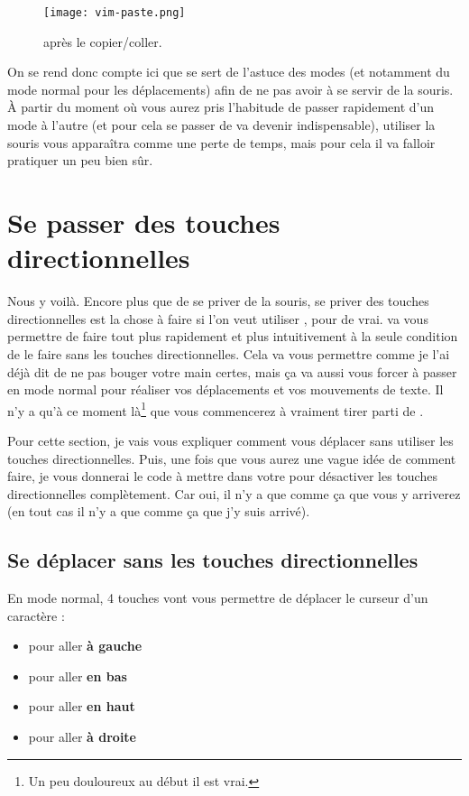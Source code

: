 \begin{figure}%
  \texttt{[image: vim-paste.png]}
  \caption{\vim après le copier/coller.}
  \label{fig:vim-paste}
\end{figure}

On se rend donc compte ici que \vim se sert de l'astuce des modes (et notamment du mode \og normal \fg{} pour les déplacements) afin de ne pas avoir à se servir de la souris.
À partir du moment où vous aurez pris l'habitude de passer rapidement d'un mode à l'autre (et pour cela se passer de \ttesc va devenir indispensable), utiliser la souris vous apparaîtra comme une perte de temps, mais pour cela il va falloir pratiquer un peu bien sûr.


\section{Se passer des touches directionnelles}\label{sec:se-passer-touches-dir}

Nous y voilà. Encore plus que de se priver de la souris, se priver des touches directionnelles est la chose à faire si l'on veut utiliser \vim, pour de vrai. \vim va vous permettre de faire tout plus rapidement et plus intuitivement à la seule condition de le faire sans les touches directionnelles.
Cela va vous permettre comme je l'ai déjà dit de ne pas bouger votre main certes, mais ça va aussi vous forcer à passer en mode \og normal \fg{} pour réaliser vos déplacements et vos mouvements de texte. Il n'y a qu'à ce moment là\footnote{Un peu douloureux au début il est vrai.} que vous commencerez à vraiment tirer parti de \vim.

Pour cette section, je vais vous expliquer comment vous déplacer sans utiliser les touches directionnelles. Puis, une fois que vous aurez une vague idée de comment faire, je vous donnerai le code à mettre dans votre \vimrc pour désactiver les touches directionnelles complètement. Car oui, il n'y a que comme ça que vous y arriverez (en tout cas il n'y a que comme ça que j'y suis arrivé).


\subsection{Se déplacer sans les touches directionnelles}

En mode normal, 4 touches vont vous permettre de déplacer le curseur d'un caractère :
\begin{itemize}
    \item \tth pour aller \textbf{à gauche}
    \item \ttj pour aller \textbf{en bas}
    \item \ttk pour aller \textbf{en haut}
    \item \ttl pour aller \textbf{à droite}
\end{itemize}

